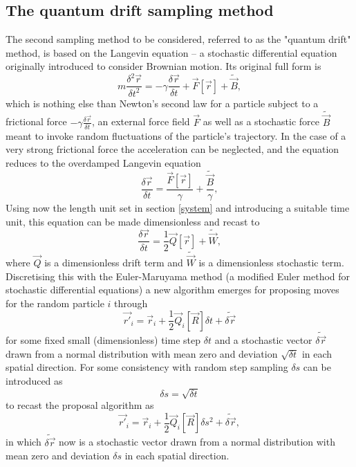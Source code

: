 \documentclass[a4paper,8pt]{article}
\begin{document}
\begin{multicols}{2}
\subsection{The quantum drift sampling method}

The second sampling method to be considered, referred to as the "quantum drift" method, is based on the Langevin equation – a stochastic differential equation originally introduced to consider Brownian motion. Its original full form is
\begin{equation}
m\frac{\delta^2\vec{r}}{\delta t^2} = -\gamma\frac{\delta\vec{r}}{\delta t}+\vec{F}[\vec{r}]+\widetilde{\vec{B}}, \label{originalLangevin}
\end{equation}
which is nothing else than Newton's second law for a particle subject to a frictional force $-\gamma\frac{\delta\vec{r}}{\delta t}$, an external force field $\vec{F}$ as well as a stochastic force $\widetilde{\vec{B}}$ meant to invoke random fluctuations of the particle's trajectory. In the case of a very strong frictional force the acceleration can be neglected, and the equation reduces to the overdamped Langevin equation
\begin{equation}
\frac{\delta\vec{r}}{\delta t} = \frac{\vec{F}[\vec{r}]}{\gamma}+\frac{\widetilde{\vec{B}}}{\gamma}, \label{overdampedLangevin}
\end{equation}
Using now the length unit set in section \ref{system} and introducing a suitable time unit, this equation can be made dimensionless and recast to
\begin{equation}
\frac{\delta\vec{r}}{\delta t} = \frac{1}{2}\vec{Q}[\vec{r}]+\widetilde{\vec{W}}, \label{Langevin}
\end{equation}
where $\vec{Q}$ is a dimensionless drift term and $\widetilde{\vec{W}}$ is a dimensionless stochastic term. Discretising this with the Euler-Maruyama method (a modified Euler method for stochastic differential equations) a new algorithm emerges for proposing moves for the random particle $i$ through
\begin{equation}
\vec{r'}_i = \vec{r}_i+\frac{1}{2}\vec{Q}_i[\vec{R}]\delta t + \widetilde{\delta\vec{r}}
\end{equation}
for some fixed small (dimensionless) time step $\delta t$ and a stochastic vector $\widetilde{\delta\vec{r}}$ drawn from a normal distribution with mean zero and deviation $\sqrt{\delta t}$ in each spatial direction. For some consistency with random step sampling $\delta s$ can be introduced as
\begin{equation}
\delta s = \sqrt{\delta t}
\end{equation}
to recast the proposal algorithm as
\begin{equation}
\vec{r'}_i = \vec{r}_i+\frac{1}{2}\vec{Q}_i[\vec{R}]\delta s^2 + \widetilde{\delta\vec{r}}, \label{propLD}
\end{equation}
in which $\widetilde{\delta\vec{r}}$ now is a stochastic vector drawn from a normal distribution with mean zero and deviation $\delta s$ in each spatial direction.


\end{multicols}
\end{document}
